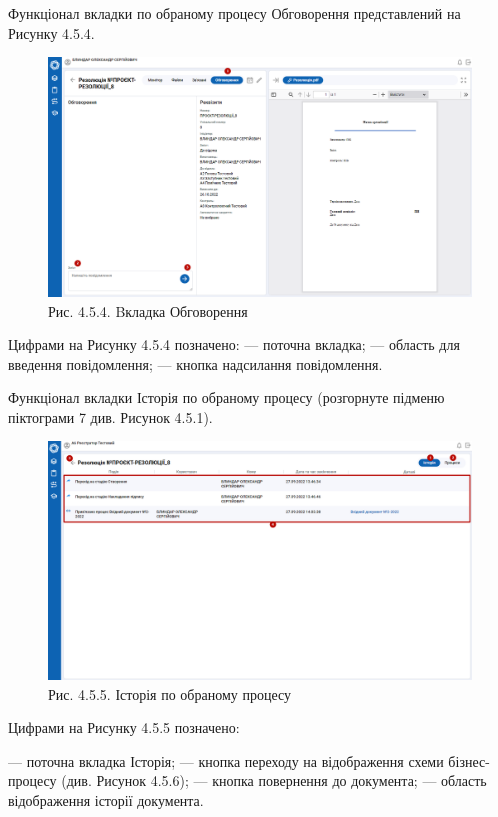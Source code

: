 Функціонал вкладки по обраному процесу Обговорення представлений на
Рисунку 4.5.4.

\begin{figure}[!htbp]
\centerline{\includegraphics[width=\textwidth]{img/4.5.4.png}}
\caption{Рис. 4.5.4. Bкладка Обговорення}
\end{figure}

Цифрами на Рисунку 4.5.4 позначено:
 --- поточна вкладка;
 --- область для введення повідомлення;
 --- кнопка надсилання повідомлення.

Функціонал вкладки Історія по обраному процесу (розгорнуте підменю
піктограми 7 див. Рисунок 4.5.1).

\begin{figure}[!htbp]
\centerline{\includegraphics[width=\textwidth]{img/4.5.5.png}}
\caption{Рис. 4.5.5. Історія по обраному процесу}
\end{figure}

Цифрами на Рисунку 4.5.5 позначено:

 --- поточна вкладка Історія;
 --- кнопка переходу на відображення схеми бізнес-процесу (див. Рисунок 4.5.6);
 --- кнопка повернення до документа;
 --- область відображення історії документа.

